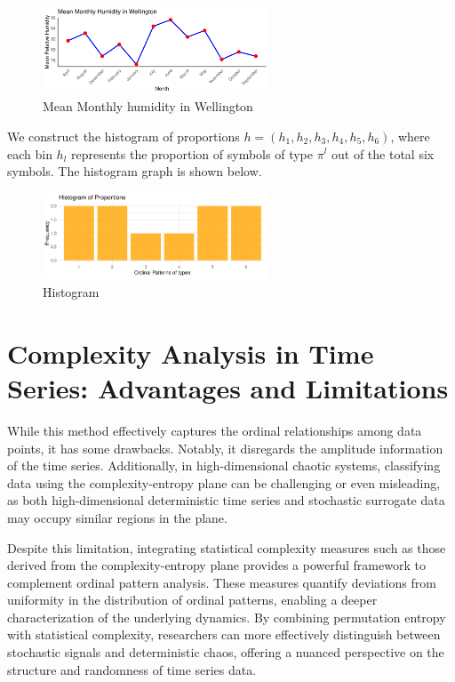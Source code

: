 \begin{figure}
	\centering
	\includegraphics[width=0.6\textwidth]{humidity graph}
	\caption{Mean Monthly humidity in Wellington}
\end{figure}

We construct the histogram of proportions $h=(h_1,h_2,h_3,h_4,h_5,h_6)$, where each bin $h_l$ represents the proportion of symbols of type $\pi^l$ out of the total six symbols. The histogram graph is shown below.

\begin{figure}
	\centering
	\includegraphics[width=0.6\textwidth]{frequency histogram}
	\caption{Histogram}
\end{figure}


\section*{Complexity Analysis in Time Series: Advantages and Limitations}

While this method effectively captures the ordinal relationships among data points, it has some drawbacks. Notably, it disregards the amplitude information of the time series. Additionally, in high-dimensional chaotic systems, classifying data using the complexity-entropy plane can be challenging or even misleading, as both high-dimensional deterministic time series and stochastic surrogate data may occupy similar regions in the plane.

Despite this limitation, integrating statistical complexity measures such as those derived from the complexity-entropy plane provides a powerful framework to complement ordinal pattern analysis. These measures quantify deviations from uniformity in the distribution of ordinal patterns, enabling a deeper characterization of the underlying dynamics. By combining permutation entropy with statistical complexity, researchers can more effectively distinguish between stochastic signals and deterministic chaos, offering a nuanced perspective on the structure and randomness of time series data.

